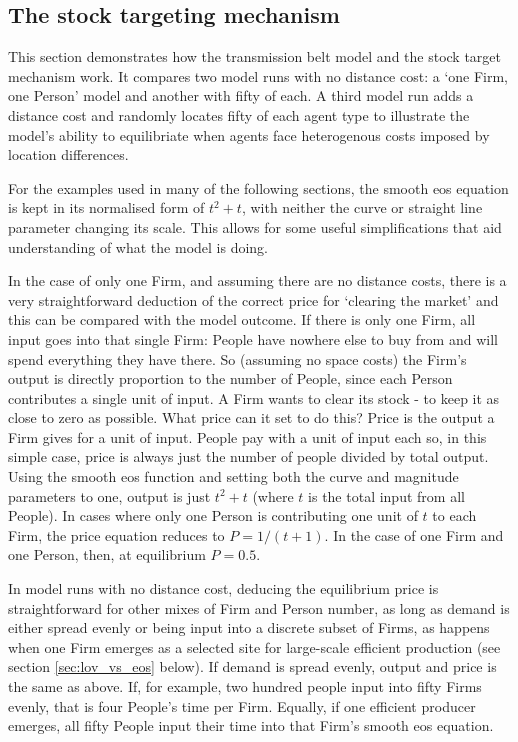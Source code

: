 \subsection{The stock targeting mechanism \label{sec:stocktarget}}

This section demonstrates how the transmission belt model and the stock target mechanism work. It compares two model runs with no distance cost: a `one Firm, one Person' model and another with fifty of each. A third model run adds a distance cost and randomly locates fifty of each agent type to illustrate the model's ability to equilibriate when agents face heterogenous costs imposed by location differences.

For the examples used in many of the following sections, the smooth \gls{eos} equation is kept in its normalised form of $t^2 + t$, with neither the curve or straight line parameter changing its scale. This allows for some useful simplifications that aid understanding of what the model is doing. 

In the case of only one Firm, and assuming there are no distance costs, there is a very straightforward deduction of the correct price for `clearing the market' and this can be compared with the model outcome. If there is only one Firm, all input goes into that single Firm: People have nowhere else to buy from and will spend everything they have there. So (assuming no space costs) the Firm's output is directly proportion to the number of People, since each Person contributes a single unit of input. A Firm wants to clear its stock - to keep it as close to zero as possible. What price can it set to do this? Price is the output a Firm gives for a unit of input. People pay with a unit of input each so, in this simple case, price is always just the number of people divided by total output. Using the smooth \gls{eos} function and setting both the curve and magnitude parameters to one, output is just $t^2 + t$ (where $t$ is the total input from all People). In cases where only one Person is contributing one unit of $t$ to each Firm, the price equation reduces to $P = 1/(t+1)$. In the case of one Firm and one Person, then, at equilibrium $P = 0.5$. 

In model runs with no distance cost, deducing the equilibrium price is straightforward for other mixes of Firm and Person number, as long as demand is either spread evenly or being input into a discrete subset of Firms, as happens when one Firm emerges as a selected site for large-scale efficient production (see section \ref{sec:lov_vs_eos} below). If demand is spread evenly, output and price is the same as above. If, for example, two hundred people input into fifty Firms evenly, that is four People's time per Firm. Equally, if one efficient producer emerges, all fifty People input their time into that Firm's smooth \gls{eos} equation.

